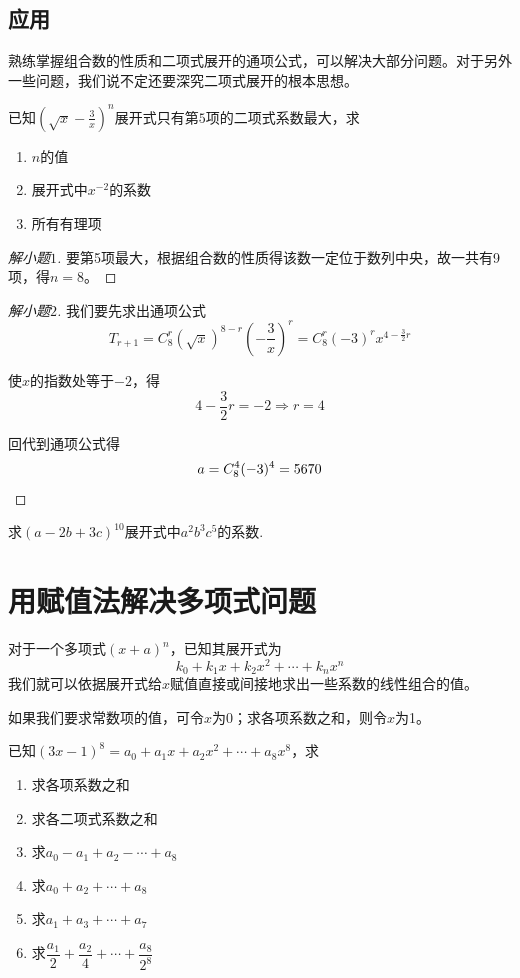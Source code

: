 \subsection{应用}
熟练掌握组合数的性质和二项式展开的通项公式，可以解决大部分问题。对于另外一些问题，我们说不定还要深究二项式展开的根本思想。

\begin{example}
	已知$(\sqrt{x}-\frac{3}{x})^n$展开式只有第$5$项的二项式系数最大，求

	\begin{enumerate}
		\item $n$的值
		\item 展开式中$x^{-2}$的系数
		\item 所有有理项
	\end{enumerate}
\end{example}

\begin{proof}[解小题$1$]
	要第5项最大，根据组合数的性质得该数一定位于数列中央，故一共有9项，得$n=8$。
\end{proof}

\begin{proof}[解小题$2$]
	我们要先求出通项公式\[T_{r+1}=C_8^r(\sqrt{x})^{8-r}(-\frac{3}{x})^r=C_8^r(-3)^rx^{4-\frac{3}{2}r}\]

	使$x$的指数处等于$-2$，得\[4-\frac{3}{2}r=-2\Rightarrow r=4\]

	回代到通项公式得\[a=C_8^4(-3)^4=5670\qedhere\]
\end{proof}

\begin{example}
	求$(a-2b+3c)^{10}$展开式中$a^2b^3c^5$的系数.
\end{example}

\section[多项式问题]{用赋值法解决多项式问题}
对于一个多项式$(x+a)^n$，已知其展开式为\[k_0+k_1x+k_2x^2+\cdots+k_nx^n\]我们就可以依据展开式给$x$赋值直接或间接地求出一些系数的线性组合的值。

如果我们要求常数项的值，可令$x$为0；求各项系数之和，则令$x$为1。

\begin{example}
	已知$(3x-1)^8=a_0+a_1x+a_2x^2+\cdots+a_8x^8$，求

	\begin{enumerate}
		\item 求各项系数之和
		\item 求各二项式系数之和
		\item 求$a_0-a_1+a_2-\cdots+a_8$
		\item 求$a_0+a_2+\cdots+a_8$
		\item 求$a_1+a_3+\cdots+a_7$
		\item 求$\dfrac{a_1}{2}+\dfrac{a_2}{4}+\cdots+\dfrac{a_8}{2^8}$
	\end{enumerate}
\end{example}
